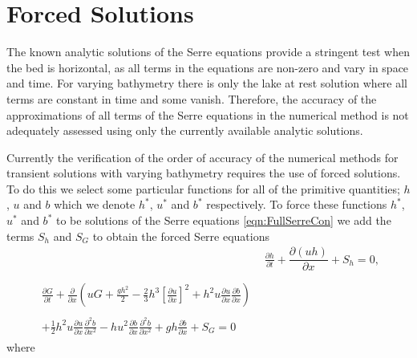 \section{Forced Solutions}
The known analytic solutions of the Serre equations provide a stringent test when the bed is horizontal, as all terms in the equations are non-zero and vary in space and time. For varying bathymetry there is only the lake at rest solution where all terms are constant in time and some vanish. Therefore, the accuracy of the approximations of all terms of the Serre equations in the numerical method is not adequately assessed using only the currently available analytic solutions.

Currently the verification of the order of accuracy of the numerical methods for transient solutions with varying bathymetry requires the use of forced solutions. To do this we select some particular functions for all of the primitive quantities; $h$, $u$ and $b$ which we denote $h^*$, $u^*$ and $b^*$ respectively. To force these functions $h^*$, $u^*$ and $b^*$ to be solutions of the Serre equations \eqref{eqn:FullSerreCon} we add the terms $S_h$ and $S_G$ to obtain the forced Serre equations
\begin{subequations}
	\label{eqn:FullSerreConForced}
	\begin{align}
	& \frac{\partial h}{\partial t} + \dfrac{\partial (uh)}{\partial x} + S_{h}  = 0 ,\label{eqn:FullSerreConMassForced}  \\ \nonumber \\
	\begin{split}
	\label{eqn:SerreconsconmomForced}
	\frac{\partial G}{\partial t}  + \frac{\partial}{\partial x} \left( {u} G + \frac{gh^2}{2} - \frac{2}{3}h^3 \left[ \frac{\partial {u}}{\partial x} \right]^2 + h^2 {u}\frac{\partial {u}}{\partial x}\frac{\partial b}{\partial x} \right) \\ \\ + \frac{1}{2}h^2 {u} \frac{\partial {u}}{\partial x} \frac{\partial^2 b}{\partial x^2}  - h {u}^2\frac{\partial b}{\partial x}\frac{\partial^2 b}{\partial x^2} + gh\frac{\partial b}{\partial x} + S_{G} = 0
	\end{split}
	\end{align}
\end{subequations}
where
